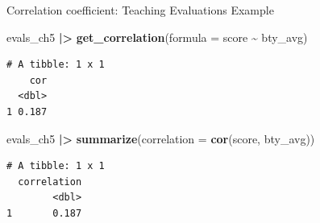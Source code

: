 \documentclass[
  ignorenonframetext,
]{beamer}
\newenvironment{Shaded}{\begin{snugshade}}{\end{snugshade}}
\newcommand{\AttributeTok}[1]{\textcolor[rgb]{0.13,0.29,0.53}{#1}}
\newcommand{\FunctionTok}[1]{\textcolor[rgb]{0.13,0.29,0.53}{\textbf{#1}}}
\newcommand{\NormalTok}[1]{#1}
\newcommand{\SpecialCharTok}[1]{\textcolor[rgb]{0.81,0.36,0.00}{\textbf{#1}}}
\begin{document}
\begin{frame}[fragile]{Correlation coefficient: Teaching Evaluations
Example}
\protect\hypertarget{correlation-coefficient-teaching-evaluations-example}{}
\normalsize

\begin{Shaded}
\begin{Highlighting}[]
\NormalTok{evals\_ch5 }\SpecialCharTok{|\textgreater{}} 
  \FunctionTok{get\_correlation}\NormalTok{(}\AttributeTok{formula =}\NormalTok{ score }\SpecialCharTok{\textasciitilde{}}\NormalTok{ bty\_avg)}
\end{Highlighting}
\end{Shaded}

\begin{verbatim}
# A tibble: 1 x 1
    cor
  <dbl>
1 0.187
\end{verbatim}

\normalsize

\normalsize

\begin{Shaded}
\begin{Highlighting}[]
\NormalTok{evals\_ch5 }\SpecialCharTok{|\textgreater{}} 
  \FunctionTok{summarize}\NormalTok{(}\AttributeTok{correlation =} \FunctionTok{cor}\NormalTok{(score, bty\_avg))}
\end{Highlighting}
\end{Shaded}

\begin{verbatim}
# A tibble: 1 x 1
  correlation
        <dbl>
1       0.187
\end{verbatim}

\normalsize
\end{frame}
\end{document}
